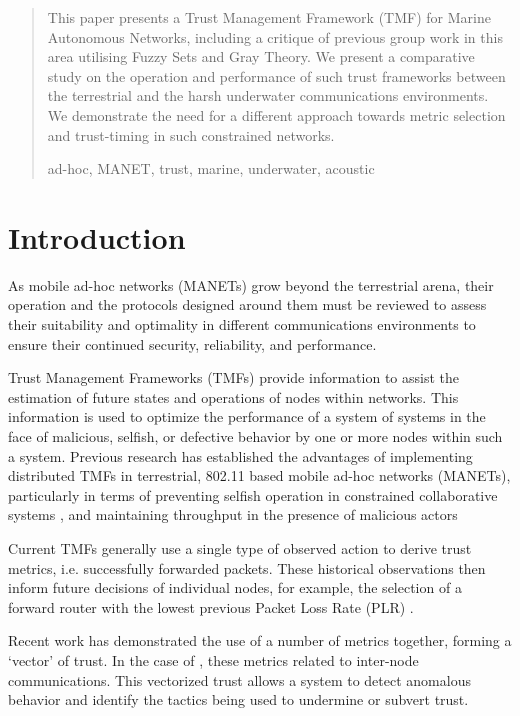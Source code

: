 \documentclass[runningheads,a4paper]{llncs}
\newcommand{\keywords}[1]{\par\addvspace\baselineskip
\noindent\keywordname\enspace\ignorespaces#1}
\begin{document}


\begin{abstract}
  This paper presents a Trust Management Framework (TMF) for Marine Autonomous Networks, including a critique of previous group work in this area utilising Fuzzy Sets and Gray Theory.
  We present a comparative study on the operation and performance of such trust frameworks between the terrestrial and the harsh underwater communications environments. 
  We demonstrate the need for a different approach towards metric selection and trust-timing in such constrained networks. 
\keywords{ad-hoc, MANET, trust, marine, underwater, acoustic}
\end{abstract}

\section{Introduction}\label{sec:introduction}

As mobile ad-hoc networks (MANETs) grow beyond the terrestrial arena, their operation and the protocols designed around them must be reviewed to assess their suitability and optimality in different communications environments to ensure their continued security, reliability, and performance.

Trust Management Frameworks (TMFs) provide information to assist the estimation of future states and operations of nodes within networks. 
This information is used to optimize the performance of a system of systems in the face of malicious, selfish, or defective behavior by one or more nodes within such a system. 
Previous research has established the advantages of implementing distributed TMFs in terrestrial, 802.11 based mobile ad-hoc networks (MANETs), particularly in terms of preventing selfish operation in constrained collaborative systems \cite{Li2007}, and maintaining throughput in the presence of malicious actors \cite{Buchegger2002}

Current TMFs generally use a single type of observed action to derive trust metrics, i.e. successfully forwarded packets. These historical observations then inform future decisions of individual nodes, for example, the selection of a forward router with the lowest previous Packet Loss Rate (PLR) \cite{Li2008}.

Recent work has demonstrated the use of a number of metrics together, forming a ‘vector’ of trust. 
In the case of \cite{Guo2012}, these metrics related to inter-node communications. 
This vectorized trust allows a system to detect anomalous behavior and identify the tactics being used to undermine or subvert trust.
\end{document}
